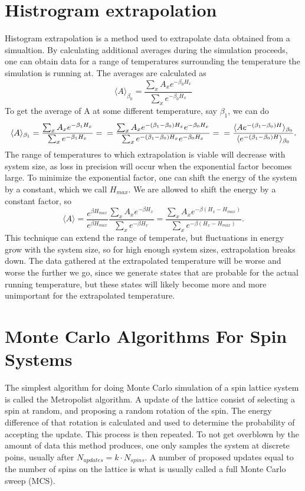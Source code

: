 \section{Histrogram extrapolation}
Histogram extrapolation is a method used to extrapolate data obtained from a simualtion.
By calculating additional averages during the simulation proceeds, one can obtain data for a range of temperatures surrounding the temperature the simulation is running at.
The averages are calculated as
\begin{equation}
  \langle A \rangle_{\beta_0} =  \frac{\sum_{x}A_x e^{-\beta_0 H_x}}{\sum_{x}e^{-\beta_0 H_x}}
\end{equation}
To get the average of A at some different temperature, say $\beta_1$, we can do
\begin{equation}
  \langle A \rangle_{\beta_1} =  \frac{\sum_{x}A_x e^{-\beta_1 H_x}}{\sum_{x}e^{- \beta_1 H_x}} = \\
  = \frac{\sum_x A_x e^{-(\beta_1 - \beta_0)H_x} e^{-\beta_0 H_x}}{\sum_x e^{-(\beta_1 - \beta_0)H_x}e^{-\beta_0 H_x}} = \\
  = \frac{\langle A e^{-(\beta_1 - \beta_0)H}\rangle_{\beta_0}}{\langle e^{-(\beta_1 - \beta_0)H}\rangle_{\beta_0}}.
\end{equation}
The range of temperatures to which extrapolation is viable will decrease with system size,
as loss in precision will occur when the exponential factor becomes large.
To minimize the exponential factor, one can shift the energy of the system by a constant, which we call $H_{max}$.
We are allowed to shift the energy by a constant factor, so
\begin{equation}
  \langle A \rangle = \frac{e^{\beta H_{max}}}{e^{\beta H_{max}}}\frac{\sum_x A_x e^{-\beta H_x}}{\sum_x e^{-\beta H_x}}= \frac{\sum_x A_x e^{-\beta(H_x-H_{max})}}{\sum_x e^{-\beta(H_x-H_{max})}}.
  \label{}
\end{equation}
This technique can extend the range of temperate, but fluctuations in energy grow with the system size, so for high enough system sizes, extrapolation breaks down.
The data gathered at the extrapolated temperature will be worse and worse the further we go, since we generate states that are probable for the actual running temperature, but these states will likely become more and more unimportant for the extrapolated temperature.



\section{Monte Carlo Algorithms For Spin Systems}
The simplest algorithm for doing Monte Carlo simulation of a spin lattice system is called the Metropolist algorithm.
A update of the lattice consist of selecting a spin at random, and proposing a random rotation of the spin. The energy difference of that rotation is calculated and used to determine the probability of accepting the update. This process is then repeated.
To not get overblown by the amount of data this method produces, one only samples the system at discrete poins, usually after $N_{updates} = k\cdot N_{spins}$.
A number of proposed updates equal to the number of spins on the lattice is what is usually called a full Monte Carlo sweep (MCS).

